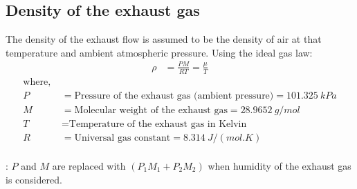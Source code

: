 \subsection{Density of the exhaust gas}

The density of the exhaust flow is assumed to be the density of air at that
temperature and ambient atmospheric pressure. Using the ideal gas law:
\begin{align}
    \rho &= \frac{PM}{R T} = \frac{\mu}{T}
\end{align}
\begin{align*}
    \text{where, } &\\
    P &= \text{Pressure of the exhaust gas (ambient pressure)} = 101.325 \: kPa\\
    M &= \text{Molecular weight of the exhaust gas} = 28.9652 \: g/mol\\
    T &= \text{Temperature of the exhaust gas in Kelvin}\\
    R &= \text{Universal gas constant} = 8.314 \: J/(mol.K)\\
\end{align*}

: $P$ and $M$ are replaced with $(P_1 M_1 + P_2 M_2)$ when humidity of the exhaust gas is considered.
